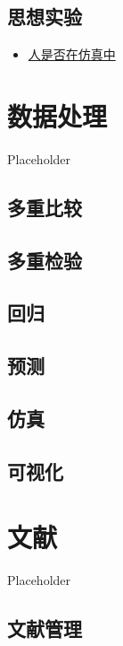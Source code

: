 \documentclass[]{book}
\providecommand{\tightlist}{%
  \setlength{\itemsep}{0pt}\setlength{\parskip}{0pt}}
\begin{document}
\section{思想实验}

\begin{itemize}
\tightlist
\item
  \href{https://www.vox.com/technology/2016/6/23/12007694/elon-musk-simulation-cartoon}{人是否在仿真中}
\end{itemize}

\chapter{数据处理}

Placeholder

\section{多重比较}

\section{多重检验}

\section{回归}

\section{预测}

\section{仿真}

\section{可视化}

\chapter{文献}

Placeholder

\section{文献管理}
\end{document}
